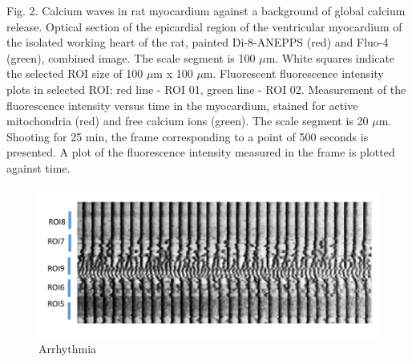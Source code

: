 \documentclass[a4paper,12pt]{article}
\begin{document}
Fig. 2.  Calcium waves in rat myocardium against a background of global calcium release. Optical section of the epicardial region of the ventricular myocardium of the isolated working heart of the rat, painted Di-8-ANEPPS (red) and Fluo-4 (green), combined image. The scale segment is 100 $\mu$m. White squares indicate the selected ROI size of 100 $\mu$m x 100 $\mu$m. Fluorescent fluorescence intensity plots in selected ROI: red line - ROI 01, green line - ROI 02. Measurement of the fluorescence intensity versus time in the myocardium, stained for active mitochondria (red) and free calcium ions (green). The scale segment is 20 $\mu$m. Shooting for 25 min, the frame corresponding to a point of 500 seconds is presented. A plot of the fluorescence intensity measured in the frame is plotted against time.

\begin{figure}
    \includegraphics[width=\linewidth]{fig7.png}
    \caption{Arrhythmia}
    \label{fig:fig7}
\end{figure}
\end{document}
